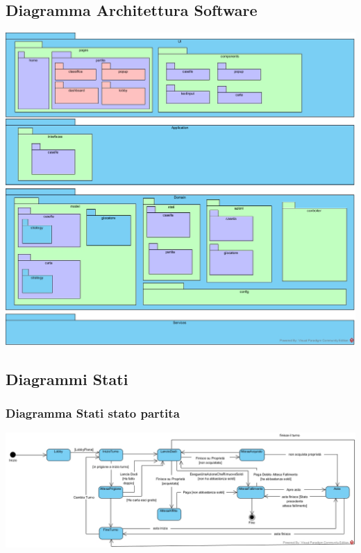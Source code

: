 \documentclass{article}
\begin{document}
\subsection{Diagramma Architettura Software}
\href{https://github.com/UnimibSoftEngCourse2022/progetto-monopoly-1-gangoffour2/blob/feat/doc/doc/img/Diagramma_Architettura_Software.jpg?raw=true}
	{\includegraphics[width=\textwidth]{Diagramma_Architettura_Software}}

\subsection{Diagrammi Stati}
\subsubsection{Diagramma Stati stato partita}
\includegraphics[width=\textwidth]{DiagrammaStatiStatoPartita}
\end{document}
